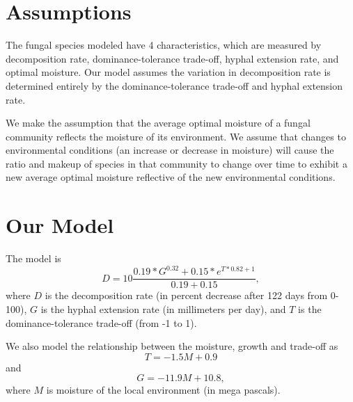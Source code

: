 \documentclass[12pt]{article}
\begin{document}
\section{Assumptions}
 
The fungal species modeled have 4 characteristics, which are measured by \cite{source25} decomposition rate, dominance-tolerance trade-off, hyphal extension rate, and optimal moisture. Our model assumes the variation in decomposition rate is determined entirely by the dominance-tolerance trade-off and hyphal extension rate. 

We make the assumption that the average optimal moisture of a fungal community reflects the moisture of its environment. We assume that changes to environmental conditions (an increase or decrease in moisture) will cause the ratio and makeup of species in that community to change over time to exhibit a new average optimal moisture reflective of the new environmental conditions. 
 




\section{Our Model}

The model is
\[
D = 10 \frac{0.19*G^{0.32} + 0.15 * e^{T*0.82+1}}{0.19+0.15},
\]
where $D$ is the decomposition rate (in percent decrease after 122 days from 0-100), $G$ is the hyphal extension rate (in millimeters per day), and $T$ is the dominance-tolerance trade-off (from -1 to 1). 

We also model the relationship between the moisture, growth and trade-off as
\[
T = -1.5 M + 0.9
\]
and 
\[
G = -11.9 M + 10.8,
\]
where $M$ is moisture of the local environment (in mega pascals).
\end{document}

